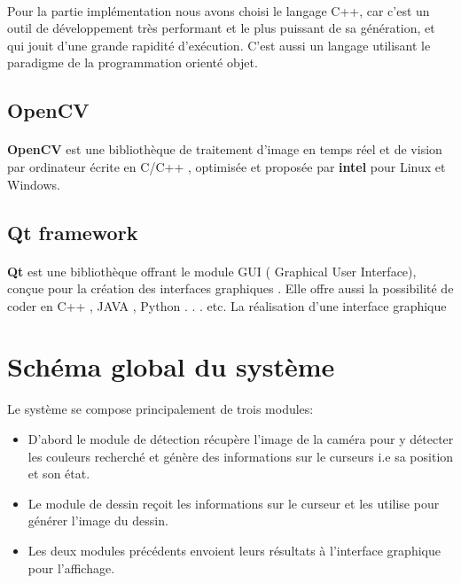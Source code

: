 \documentclass[12pt]{report}
\begin{document}
		\paragraph{}
	
		Pour la partie implémentation nous avons choisi le langage C++, car c'est un outil 
		de développement très performant et le plus puissant de sa génération, et qui jouit
		d'une grande rapidité d'exécution. C'est aussi un langage utilisant le paradigme 
		de la programmation orienté objet.
		
		\subsection{OpenCV}
		\paragraph{}
		\textbf{OpenCV }est une bibliothèque de traitement d'image en temps réel et de vision
		par ordinateur écrite en C/C++ , optimisée et proposée par \textbf{intel} pour Linux et
		Windows.
		\subsection{Qt framework}
		\paragraph{}
		\textbf{Qt} est une bibliothèque offrant le module GUI ( Graphical User Interface),
		conçue pour la création des interfaces graphiques . Elle offre aussi la possibilité
		de coder en C++ , JAVA , Python . . . etc. La réalisation d'une interface graphique
	
	\section{Schéma global du système}
	Le système se compose principalement de trois modules:
	
	\begin{itemize}
		\item D’abord le module de détection récupère l’image de la caméra pour y détecter les couleurs recherché et génère des informations sur le curseurs i.e sa position et son état.
		
		\item Le module de dessin reçoit les informations sur le curseur et les utilise pour générer l’image du dessin.
		
		\item Les deux modules précédents envoient leurs résultats à l’interface graphique pour l’affichage.
	\end{itemize}
	
\end{document}
